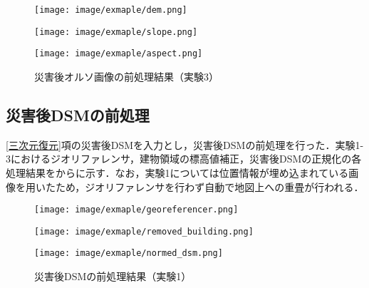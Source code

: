       \begin{figure}[t]
        \begin{minipage}[c]{0.329\hsize}
          \centering
          \texttt{[image: image/exmaple/dem.png]}
        \end{minipage}
        \begin{minipage}[c]{0.329\hsize}
          \centering
          \texttt{[image: image/exmaple/slope.png]}
        \end{minipage}
        \begin{minipage}[c]{0.329\hsize}
          \centering
          \texttt{[image: image/exmaple/aspect.png]}
        \end{minipage}
        \caption{災害後オルソ画像の前処理結果（実験3）}
        \label{災害後オルソ画像の前処理結果（実験3）}
      \end{figure}


    \subsection{災害後DSMの前処理}
      \ref{三次元復元}項の災害後DSMを入力とし，災害後DSMの前処理を行った．実験1-3におけるジオリファレンサ，建物領域の標高値補正，災害後DSMの正規化の各処理結果をからに示す．なお，実験1については位置情報が埋め込まれている画像を用いたため，ジオリファレンサを行わず自動で地図上への重畳が行われる．

      \begin{figure}[t]
        \begin{minipage}[c]{0.329\hsize}
          \centering
          \texttt{[image: image/exmaple/georeferencer.png]}
        \end{minipage}
        \begin{minipage}[c]{0.329\hsize}
          \centering
          \texttt{[image: image/exmaple/removed\_building.png]}
        \end{minipage}
        \begin{minipage}[c]{0.329\hsize}
          \centering
          \texttt{[image: image/exmaple/normed\_dsm.png]}
        \end{minipage}
        \caption{災害後DSMの前処理結果（実験1）}
        \label{災害後DSMの前処理結果（実験1）}
      \end{figure}

